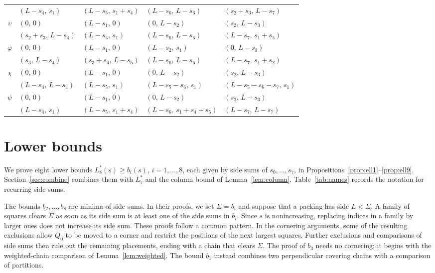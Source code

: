 \documentclass[12pt]{amsart}
\theoremstyle{definition}
\theoremstyle{remark}
\numberwithin{equation}{section}
\numberwithin{figure}{section}
\numberwithin{table}{section}
\begin{document}
\begin{longtable}{c@{\qquad}llll}
 & $(L-s_4,\,s_1)$ & $(L-s_5,\,s_1+s_4)$ & $(L-s_6,\,L-s_6)$ & $(s_2+s_3,\,L-s_7)$ \\[1.2pt]
$\upsilon$ & $(0,\,0)$ & $(L-s_1,\,0)$ & $(0,\,L-s_2)$ & $(s_2,\,L-s_3)$ \\*
 & $(s_2+s_3,\,L-s_4)$ & $(L-s_5,\,s_1)$ & $(L-s_6,\,L-s_6)$ & $(L-s_7,\,s_1+s_5)$ \\[1.2pt]
$\varphi$ & $(0,\,0)$ & $(L-s_1,\,0)$ & $(L-s_2,\,s_1)$ & $(0,\,L-s_3)$ \\*
 & $(s_3,\,L-s_4)$ & $(s_3+s_4,\,L-s_5)$ & $(L-s_6,\,L-s_6)$ & $(L-s_7,\,s_1+s_2)$ \\[1.2pt]
$\chi$ & $(0,\,0)$ & $(L-s_1,\,0)$ & $(0,\,L-s_2)$ & $(s_2,\,L-s_3)$ \\*
 & $(L-s_4,\,L-s_4)$ & $(L-s_5,\,s_1)$ & $(L-s_5-s_6,\,s_1)$ & $(L-s_5-s_6-s_7,\,s_1)$ \\[1.2pt]
$\psi$ & $(0,\,0)$ & $(L-s_1,\,0)$ & $(0,\,L-s_2)$ & $(s_2,\,L-s_3)$ \\*
 & $(L-s_4,\,s_1)$ & $(L-s_5,\,s_1+s_4)$ & $(L-s_6,\,s_1+s_4+s_5)$ & $(L-s_7,\,L-s_7)$ \\[1.2pt]
\end{longtable}
\endgroup

\section{Lower bounds}\label{sec:lower}
We prove eight lower bounds $L_8^*(s)\ge b_i(s)$, $i=1,\ldots,8$, each
given by side sums of $s_0,\ldots,s_7$, in
Propositions~\ref{prop:ell1}--\ref{prop:ell9}. Section~\ref{sec:combine}
combines them with $L_7^*$ and the column bound of
Lemma~\ref{lem:column}. Table~\ref{tab:names}
records the notation for recurring side sums.

The bounds $b_2,\ldots,b_8$ are minima of side sums. In their proofs, we
set $\Sigma=b_i$ and suppose that a packing has side
$L<\Sigma$. A family of squares clears $\Sigma$ as soon as its side sum is at
least one of the side sums in $b_i$. Since $s$ is nonincreasing, replacing
indices in a family by larger ones does not increase its side sum. These
proofs follow a common pattern. In the
cornering arguments, some of the resulting exclusions allow $Q_0$ to be moved to a corner and restrict the positions of the next
largest squares. Further exclusions and comparisons of side sums then
rule out the remaining placements, ending with a chain that clears
$\Sigma$. The proof of $b_3$ needs no cornering; it begins with the
weighted-chain comparison of Lemma~\ref{lem:weighted}. The bound $b_1$
instead combines two perpendicular covering chains with a comparison of
partitions.
\end{document}

